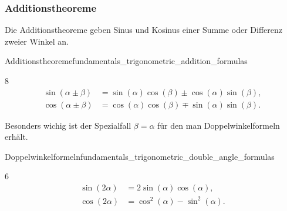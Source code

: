 \subsubsection{Additionstheoreme}

Die Additionstheoreme geben Sinus und Kosinus einer Summe oder Differenz zweier
Winkel an.

\begin{TheoremBox}{Additionstheoreme}{fundamentals_trigonometric_addition_formulas}
  \begin{ClozeArea}[34]{8}
    \begin{align*}
      \sin(\alpha\pm\beta)
        &=\sin(\alpha)\cos(\beta)
          \pm\cos(\alpha)\sin(\beta),\\
      \cos(\alpha\pm\beta)
        &=\cos(\alpha)\cos(\beta)
          \mp\sin(\alpha)\sin(\beta).
    \end{align*}
  \end{ClozeArea}
\end{TheoremBox}

Besonders wichig ist der Spezialfall $\beta=\alpha$ für den man Doppelwinkelformeln erhält.

\begin{KeyPointBox}{Doppelwinkelformeln}{fundamentals_trigonometric_double_angle_formulas}
  \begin{ClozeArea}[28]{6}
    \begin{align*}
      \sin(2\alpha)&=2\sin(\alpha)\cos(\alpha),\\
      \cos(2\alpha)&=\cos^2(\alpha)-\sin^2(\alpha).
    \end{align*}
  \end{ClozeArea}
\end{KeyPointBox}

